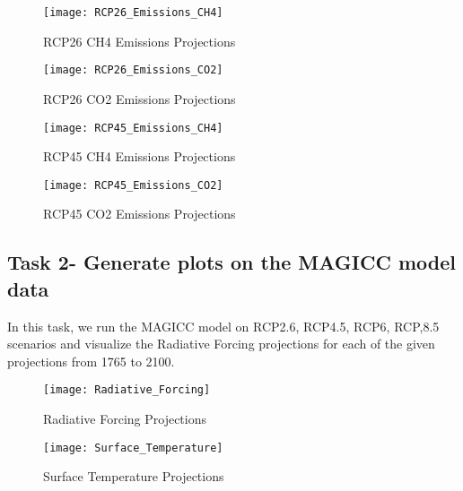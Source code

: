 \documentclass{article}
\begin{document}
\begin{figure}[ht]
    \texttt{[image: RCP26\_Emissions\_CH4]}
    \caption{RCP26 CH4 Emissions Projections}
\end{figure}

\begin{figure}
    \texttt{[image: RCP26\_Emissions\_CO2]}
    \caption{RCP26 CO2 Emissions Projections}
\end{figure}

\begin{figure}
    \texttt{[image: RCP45\_Emissions\_CH4]}
    \caption{RCP45 CH4 Emissions Projections}
\end{figure}

\begin{figure}
    \texttt{[image: RCP45\_Emissions\_CO2]}
    \caption{RCP45 CO2 Emissions Projections}
\end{figure}

\clearpage
\subsection{Task 2- Generate plots on the MAGICC model data}
In this task, we run the MAGICC model on RCP2.6, RCP4.5, RCP6, RCP,8.5 scenarios and visualize the Radiative Forcing projections for each of the given projections from 1765 to 2100.
\begin{figure}[H]
\texttt{[image: Radiative\_Forcing]}
\caption{Radiative Forcing Projections}
\end{figure}

\begin{figure}[H]
\texttt{[image: Surface\_Temperature]}
\caption{Surface Temperature Projections}
\end{figure}
    



\end{document}
